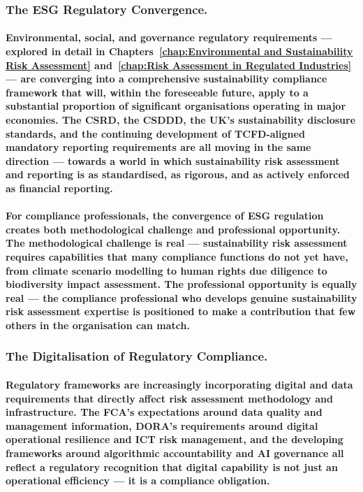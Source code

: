 \subsubsection{The ESG Regulatory Convergence.}
\paragraph{Environmental, social, and governance regulatory requirements — explored in detail in Chapters~\ref{chap:Environmental and Sustainability Risk Assessment} and~\ref{chap:Risk Assessment in Regulated Industries} — are converging into a comprehensive sustainability compliance framework that will, within the foreseeable future, apply to a substantial proportion of significant organisations operating in major economies. The CSRD, the CSDDD, the UK's sustainability disclosure standards, and the continuing development of TCFD-aligned mandatory reporting requirements are all moving in the same direction — towards a world in which sustainability risk assessment and reporting is as standardised, as rigorous, and as actively enforced as financial reporting.}
\paragraph{For compliance professionals, the convergence of ESG regulation creates both methodological challenge and professional opportunity. The methodological challenge is real — sustainability risk assessment requires capabilities that many compliance functions do not yet have, from climate scenario modelling to human rights due diligence to biodiversity impact assessment. The professional opportunity is equally real — the compliance professional who develops genuine sustainability risk assessment expertise is positioned to make a contribution that few others in the organisation can match.}
\subsubsection{The Digitalisation of Regulatory Compliance.}
\paragraph{Regulatory frameworks are increasingly incorporating digital and data requirements that directly affect risk assessment methodology and infrastructure. The FCA's expectations around data quality and management information, DORA's requirements around digital operational resilience and ICT risk management, and the developing frameworks around algorithmic accountability and AI governance all reflect a regulatory recognition that digital capability is not just an operational efficiency — it is a compliance obligation.}
